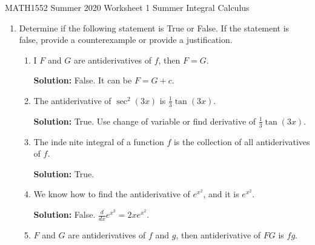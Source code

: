 \documentclass[12pt]{article}
\begin{document}
\noindent
MATH1552 Summer 2020
\hspace{2.2cm}
Worksheet 1 Summer
\hspace{2cm} Integral Calculus

\vspace{2mm}


\begin{enumerate}
    \item Determine if the following statement is True or False. If the statement is false, provide a counterexample or provide a justification. 
    \begin{enumerate}
        \item I $F$ and $G$ are antiderivatives of $f$, then $F=G$.
        
        {\bf Solution:} False.  It can be $F=G+c$.
        
        \item The antiderivative of $\sec^2(3x)$ is $\frac{1}{3}\tan(3x)$.
        
        {\bf Solution:} True. Use change of variable or find derivative of $\frac{1}{3}\tan(3x)$.
        
        \item The indenite integral of a function $f$ is the collection of all antiderivatives of $f$.
        
        {\bf Solution:} True.
        
        \item We know how to find the antiderivative of $e^{x^2}$, and it is $e^{x^2}$.

	{\bf Solution:} False. $\frac{d}{dx} e^{x^2} =2xe^{x^2}$. 

	\item $F$ and $G$ are antiderivatives of $f$ and $g$, then antiderivative of $FG$ is $fg$. 


\end{enumerate}
\end{enumerate}
\end{document}
